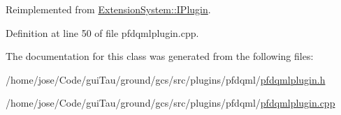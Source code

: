 Reimplemented from \hyperlink{class_extension_system_1_1_i_plugin_a65c16ebd3a6e89918a99af6515fe68cb}{Extension\-System\-::\-I\-Plugin}.



Definition at line 50 of file pfdqmlplugin.\-cpp.



The documentation for this class was generated from the following files\-:\begin{DoxyCompactItemize}
\item 
/home/jose/\-Code/gui\-Tau/ground/gcs/src/plugins/pfdqml/\hyperlink{pfdqmlplugin_8h}{pfdqmlplugin.\-h}\item 
/home/jose/\-Code/gui\-Tau/ground/gcs/src/plugins/pfdqml/\hyperlink{pfdqmlplugin_8cpp}{pfdqmlplugin.\-cpp}\end{DoxyCompactItemize}
